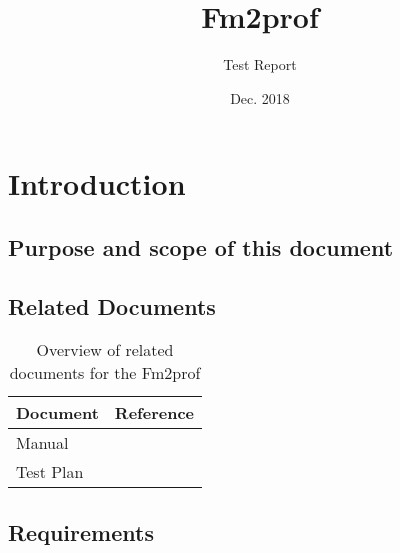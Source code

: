 \documentclass[signature]{deltares_report}
\begin{document}
\pagestyle{empty}
\cleardoublepage
%

\newcommand{\ProgramName}{Fm2prof\xspace}

\title{\ProgramName}
\subtitle{Test Report}
\classification{-}

\date{Dec. 2018}



\summary{}

\revieweri{}
\approvali{}

\disclaimer{}

\deltarestitle


\chapter{Introduction} 
\label{chapterIntroduction}

\section{Purpose and scope of this document} \label{sec:PurposeAndScope}


\section{Related Documents}
\label{sec:RelatedDocuments}
\bigskip
\begin{longtable}{|p{}|p{}|}
\caption{Overview of related documents for the \ProgramName \label{tab:RelatedDocuments}}\\	\hline
		\hline 
		\textbf{Document} & \textbf{Reference} \\
		\hline 
		\hline 
		Manual & \citep{Fm2prof_Manual2018} \\
		Test Plan & \citep{Fm2prof_TestPlan2018}  \\
    \hline			
\end{longtable}

\section{Requirements}
\label{sec:requirements}
\end{document}
